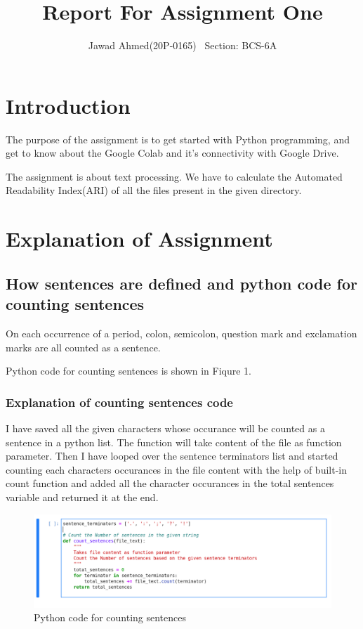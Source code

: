\documentclass{article}
\title{Report For Assignment One}
\author{Jawad Ahmed(20P-0165) \ Section: BCS-6A}
\begin{document}
\maketitle

\section{Introduction}

The purpose of the assignment is to get started with Python programming, and get to know about the Google Colab and it's connectivity with Google Drive.

The assignment is about text processing. We have to calculate the Automated Readability Index(ARI) of all the files present in the given directory. 

\section{Explanation of Assignment}

\subsection{How sentences are defined and python code for counting sentences}

On each occurrence of a period, colon, semicolon, question mark and exclamation marks are all counted as a sentence. 

Python code for counting sentences is shown in Fiqure 1.
\subsubsection{Explanation of counting sentences code}
I have saved all the given characters whose occurance will be counted as a sentence in a python list. The function will take content of the file as function parameter. Then I have looped over the sentence terminators list and started counting each characters occurances in the file content with the help of built-in count function and added all the character occurances in the total sentences variable and returned it at the end. 

\begin{figure}
\centering
\includegraphics[scale=0.2]{screenshots/ai_a1-1.png}
\caption{\label{fig:python_code_counting_sentences}Python code for counting sentences}
\end{figure}
\end{document}
